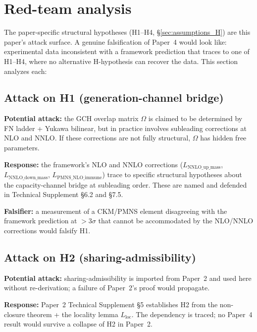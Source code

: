 \documentclass[11pt]{article}
\theoremstyle{definition}
\begin{document}
\clearpage

\section{Red-team analysis}\label{sec:redteam}

The paper-specific structural hypotheses (H1--H4, \S\ref{sec:assumptions_H}) are this paper's attack surface. A genuine falsification of Paper~4 would look like: experimental data inconsistent with a framework prediction that traces to one of H1--H4, where no alternative H-hypothesis can recover the data. This section analyzes each:

\subsection{Attack on H1 (generation-channel bridge)}\label{sec:redteam_H1}

\textbf{Potential attack:} the GCH overlap matrix $\Omega$ is claimed to be determined by FN ladder + Yukawa bilinear, but in practice involves subleading corrections at NLO and NNLO. If these corrections are not fully structural, $\Omega$ has hidden free parameters.

\textbf{Response:} the framework's NLO and NNLO corrections ($L_{\mathrm{NNLO\_up\_mass}}$, $L_{\mathrm{NNLO\_down\_mass}}$, $L_{\mathrm{PMNS\_NLO\_immune}}$) trace to specific structural hypotheses about the capacity-channel bridge at subleading order. These are named and defended in Technical Supplement \S6.2 and \S7.5.

\textbf{Falsifier:} a measurement of a CKM/PMNS element disagreeing with the framework prediction at $>3\sigma$ that cannot be accommodated by the NLO/NNLO corrections would falsify H1.

\subsection{Attack on H2 (sharing-admissibility)}\label{sec:redteam_H2}

\textbf{Potential attack:} sharing-admissibility is imported from Paper~2 and used here without re-derivation; a failure of Paper~2's proof would propagate.

\textbf{Response:} Paper~2 Technical Supplement \S5 establishes H2 from the non-closure theorem + the locality lemma $L_{\mathrm{loc}}$. The dependency is traced; no Paper~4 result would survive a collapse of H2 in Paper~2.
\end{document}
